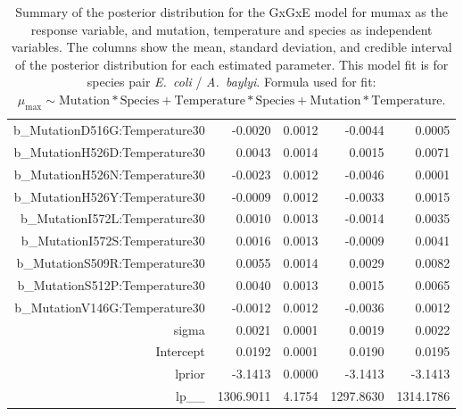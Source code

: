 \begin{table}[ht]
\begin{tabular}{rrrrr}
  b\_MutationD516G:Temperature30 & -0.0020 & 0.0012 & -0.0044 & 0.0005 \\ 
  b\_MutationH526D:Temperature30 & 0.0043 & 0.0014 & 0.0015 & 0.0071 \\ 
  b\_MutationH526N:Temperature30 & -0.0023 & 0.0012 & -0.0046 & 0.0001 \\ 
  b\_MutationH526Y:Temperature30 & -0.0009 & 0.0012 & -0.0033 & 0.0015 \\ 
  b\_MutationI572L:Temperature30 & 0.0010 & 0.0013 & -0.0014 & 0.0035 \\ 
  b\_MutationI572S:Temperature30 & 0.0016 & 0.0013 & -0.0009 & 0.0041 \\ 
  b\_MutationS509R:Temperature30 & 0.0055 & 0.0014 & 0.0029 & 0.0082 \\ 
  b\_MutationS512P:Temperature30 & 0.0040 & 0.0013 & 0.0015 & 0.0065 \\ 
  b\_MutationV146G:Temperature30 & -0.0012 & 0.0012 & -0.0036 & 0.0012 \\ 
  sigma & 0.0021 & 0.0001 & 0.0019 & 0.0022 \\ 
  Intercept & 0.0192 & 0.0001 & 0.0190 & 0.0195 \\ 
  lprior & -3.1413 & 0.0000 & -3.1413 & -3.1413 \\ 
  lp\_\_ & 1306.9011 & 4.1754 & 1297.8630 & 1314.1786 \\ 
   \hline
\end{tabular}
\endgroup
\caption{Summary of the posterior distribution for the GxGxE model for mumax as the response variable, and mutation, temperature and species as independent variables. The columns show the mean, standard deviation, and credible interval of the posterior distribution for each estimated parameter. This model fit is for species pair \textit{E.~coli} / \textit{A.~baylyi}. Formula used for fit: $\mu_{\text{max}} \sim \text{Mutation} * \text{Species} + \text{Temperature} * \text{Species} + \text{Mutation} * \text{Temperature}$.} 
\label{supptab:GxGxe_no3way_mumax}
\end{table}



